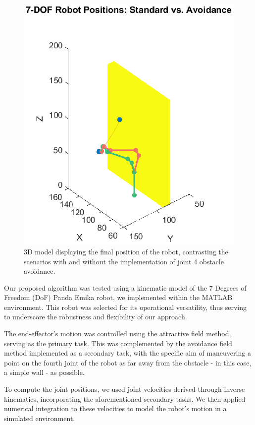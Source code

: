 \documentclass[a4paper]{article}
\begin{document}
\begin{figure}[htbp]
	\centering
	\includegraphics[width=1.0\linewidth]{7-DOF_Robot_Positions_Standard_vs_Avoidance.eps}
	\caption{3D model displaying the final position of the robot, contrasting the scenarios with and without the implementation of joint 4 obstacle avoidance.}
	\label{3D model}
\end{figure}
	 	 

Our proposed algorithm was tested using a kinematic model of the 7 Degrees of Freedom (DoF) Panda Emika robot, we implemented within the MATLAB environment. This robot was selected for its operational versatility, thus serving to underscore the robustness and flexibility of our approach.

The end-effector's motion was controlled using the attractive field method, serving as the primary task. This was complemented by the avoidance field method implemented as a secondary task, with the specific aim of maneuvering a point on the fourth joint of the robot as far away from the obstacle - in this case, a simple wall - as possible.

To compute the joint positions, we used joint velocities derived through inverse kinematics, incorporating the aforementioned secondary tasks. We then applied numerical integration to these velocities to model the robot's motion in a simulated environment.
\end{document}
